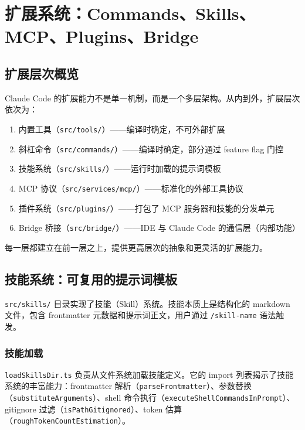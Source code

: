 \chapter{扩展系统：Commands、Skills、MCP、Plugins、Bridge}

\section{扩展层次概览}

Claude Code 的扩展能力不是单一机制，而是一个多层架构。从内到外，扩展层次依次为：

\begin{enumerate}
  \item 内置工具（\texttt{src/tools/}）——编译时确定，不可外部扩展
  \item 斜杠命令（\texttt{src/commands/}）——编译时确定，部分通过 feature flag 门控
  \item 技能系统（\texttt{src/skills/}）——运行时加载的提示词模板
  \item MCP 协议（\texttt{src/services/mcp/}）——标准化的外部工具协议
  \item 插件系统（\texttt{src/plugins/}）——打包了 MCP 服务器和技能的分发单元
  \item Bridge 桥接（\texttt{src/bridge/}）——IDE 与 Claude Code 的通信层（内部功能）
\end{enumerate}

每一层都建立在前一层之上，提供更高层次的抽象和更灵活的扩展能力。

\section{技能系统：可复用的提示词模板}

\texttt{src/skills/} 目录实现了技能（Skill）系统。技能本质上是结构化的 markdown 文件，包含 frontmatter 元数据和提示词正文，用户通过 \texttt{/skill-name} 语法触发。

\subsection{技能加载}

\texttt{loadSkillsDir.ts} 负责从文件系统加载技能定义。它的 import 列表揭示了技能系统的丰富能力：frontmatter 解析（\texttt{parseFrontmatter}）、参数替换（\texttt{substituteArguments}）、shell 命令执行（\texttt{executeShellCommandsInPrompt}）、gitignore 过滤（\texttt{isPathGitignored}）、token 估算（\texttt{roughTokenCountEstimation}）。

